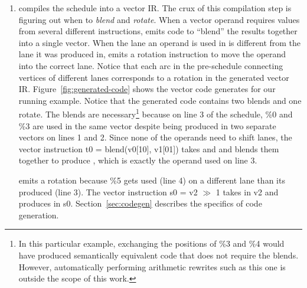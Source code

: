 \begin{enumerate}
    \item \system compiles the schedule into a vector IR. The crux of this compilation step is figuring out when to {\em blend} and {\em rotate}. When a vector operand requires values from several different instructions, \system emits code to ``blend'' the results together into a single vector.
    When the lane an operand is used in is different from the lane it was produced in, \system emits a rotation instruction to move the operand into the correct lane. Notice that each arc in the pre-schedule connecting vertices of different lanes corresponds to a rotation in the generated vector IR.
    Figure~\ref{fig:generated-code} shows the vector code \system generates for our running example.
    Notice that the generated code contains two blends and one rotate.
    The blends are necessary\footnote{In this particular example, exchanging the positions of {\sf \%3} and {\sf \%4} would have produced semantically equivalent code that does not require the blends. However, automatically performing arithmetic rewrites such as this one is outside the scope of this work.} because on line 3 of the schedule, {\sf \%0} and {\sf \%3} are used in the same vector despite being produced in two separate vectors on lines 1 and 2. 
    Since none of the operands need to shift lanes, the vector instruction {\sf t0 = blend(v0[10], v1[01])} takes {\sf [\%0, \%4]} and {\sf [\%1, \%3]} and blends them together to produce {\sf [\%0, \%3]}, which is exactly the operand used on line 3. 

    \system emits a rotation because {\sf \%5} gets used (line 4) on a different lane than its produced (line 3).
    The vector instruction {\sf s0 = v2 $\gg$ 1} takes {\sf [\%2, \%5]} in {\sf v2} and produces {\sf [\%5, \%2]} in {\sf s0}.
    Section~\ref{sec:codegen} describes the specifics of code generation.
\end{enumerate}

